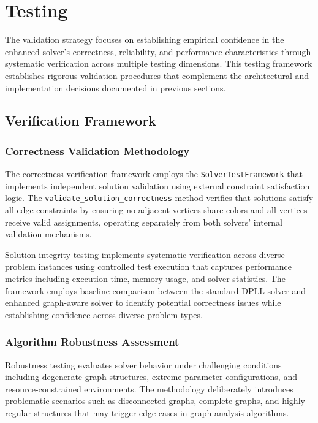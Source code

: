 \section{Testing}

The validation strategy focuses on establishing empirical confidence in the enhanced solver's correctness, reliability, and performance characteristics through systematic verification across multiple testing dimensions. This testing framework establishes rigorous validation procedures that complement the architectural and implementation decisions documented in previous sections.

\subsection{Verification Framework}

\subsubsection{Correctness Validation Methodology}
The correctness verification framework employs the \texttt{SolverTestFramework} that implements independent solution validation using external constraint satisfaction logic. The \texttt{validate\_solution\_correctness} method verifies that solutions satisfy all edge constraints by ensuring no adjacent vertices share colors and all vertices receive valid assignments, operating separately from both solvers' internal validation mechanisms.

Solution integrity testing implements systematic verification across diverse problem instances using controlled test execution that captures performance metrics including execution time, memory usage, and solver statistics. The framework employs baseline comparison between the standard DPLL solver and enhanced graph-aware solver to identify potential correctness issues while establishing confidence across diverse problem types.

\subsubsection{Algorithm Robustness Assessment}
Robustness testing evaluates solver behavior under challenging conditions including degenerate graph structures, extreme parameter configurations, and resource-constrained environments. The methodology deliberately introduces problematic scenarios such as disconnected graphs, complete graphs, and highly regular structures that may trigger edge cases in graph analysis algorithms.

